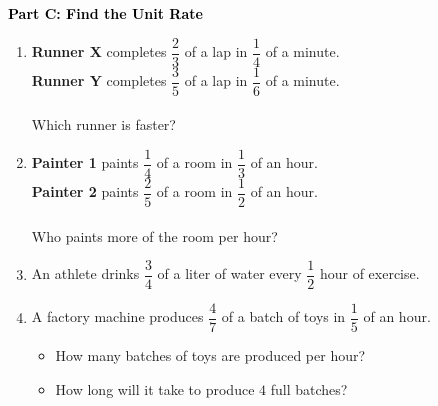 \documentclass[12pt, letterpaper, fleqn]{article}
\begin{document}
\newpage

\begin{tcolorbox}[colback=customteal!20]
\large\textcolor{black}{\textbf{Part C: Find the Unit Rate}}
\end{tcolorbox}

\vspace{3mm}

\begin{enumerate}[itemsep=4.2cm, leftmargin=0.6cm, resume]
\item \textbf{Runner X} completes $\dfrac{2}{3}$ of a lap in $\dfrac{1}{4}$ of a minute. \\
\textbf{Runner Y} completes $\dfrac{3}{5}$ of a lap in $\dfrac{1}{6}$ of a minute. \\ \\
Which runner is faster?
\item \textbf{Painter 1} paints $\dfrac{1}{4}$ of a room in $\dfrac{1}{3}$ of an hour. \\
\textbf{Painter 2} paints $\dfrac{2}{5}$ of a room in $\dfrac{1}{2}$ of an hour. \\ \\
Who paints more of the room per hour?
\item An athlete drinks $\dfrac{3}{4}$ of a liter of water every $\dfrac{1}{2}$ hour of exercise.
\item A factory machine produces $\dfrac{4}{7}$ of a batch of toys in $\dfrac{1}{5}$ of an hour.
\begin{itemize}
\item How many batches of toys are produced per hour?
\item How long will it take to produce $4$ full batches?
\end{itemize}
\end{enumerate}
\end{document}
